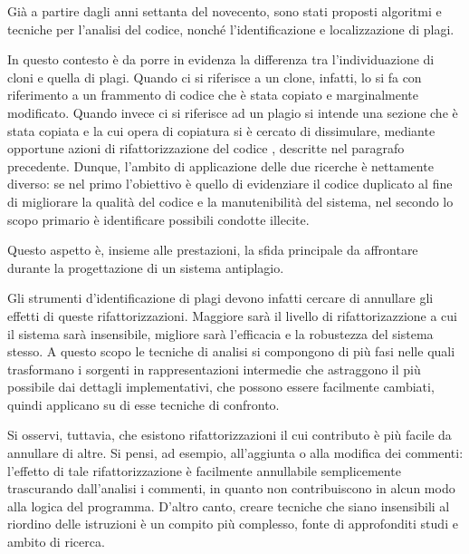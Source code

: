 Già a partire dagli anni settanta del novecento, sono stati proposti algoritmi e tecniche per l'analisi del codice, nonché l'identificazione e localizzazione di plagi.

In questo contesto è da porre in evidenza la differenza tra l'individuazione di cloni e quella di plagi.
%
Quando ci si riferisce a un clone, infatti, lo si fa con riferimento a un frammento di codice che è stata copiato e marginalmente modificato. 
%
Quando invece ci si riferisce ad un plagio si intende una sezione che è stata copiata e la cui opera di copiatura si è cercato di dissimulare, mediante opportune azioni di rifattorizzazione del codice \cite{cpdp}, descritte nel paragrafo precedente.
%
Dunque, l'ambito di applicazione delle due ricerche è nettamente diverso: se nel primo l'obiettivo è quello di evidenziare il codice duplicato al fine di migliorare la qualità del codice e la manutenibilità del sistema, nel secondo lo scopo primario è identificare possibili condotte illecite.

Questo aspetto è, insieme alle prestazioni, la sfida principale da affrontare durante la progettazione di un sistema antiplagio.

Gli strumenti d'identificazione di plagi devono infatti cercare di annullare gli effetti di queste rifattorizzazioni.
%
Maggiore sarà il livello di rifattorizazzione a cui il sistema sarà insensibile, migliore sarà l'efficacia e la robustezza del sistema stesso.
%
A questo scopo le tecniche di analisi si compongono di più fasi nelle quali trasformano i sorgenti in rappresentazioni intermedie che astraggono il più possibile dai dettagli implementativi, che possono essere facilmente cambiati, quindi applicano su di esse tecniche di confronto.

Si osservi, tuttavia, che esistono rifattorizzazioni il cui contributo è più facile da annullare di altre. 
%
Si pensi, ad esempio, all'aggiunta o alla modifica dei commenti: l'effetto di tale rifattorizzazione è facilmente annullabile semplicemente trascurando dall'analisi i commenti, in quanto non contribuiscono in alcun modo alla logica del programma. 
%
D'altro canto, creare tecniche che siano insensibili al riordino delle istruzioni è un compito più complesso, fonte di approfonditi studi e ambito di ricerca.

